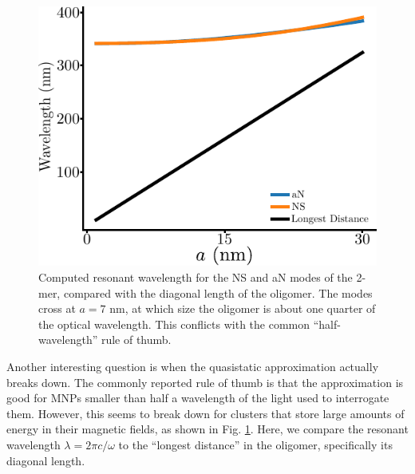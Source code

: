 \documentclass [11pt, proquest] {uwthesis}[2016/11/22]
\begin{document}
\begin{figure}
\begin{centering}
\includegraphics{length_comparison_scale.pdf}
\caption{Computed resonant wavelength for the NS and aN modes of the 2-mer, compared with the diagonal length of the oligomer. The modes cross at $a = 7$ nm, at which size the oligomer is about one quarter of the optical wavelength. This conflicts with the common ``half-wavelength'' rule of thumb.}
\label{scale_wavelength_comp}
\end{centering}
\end{figure}


Another interesting question is when the quasistatic approximation actually breaks down. The commonly reported rule of thumb is that the approximation is good for MNPs smaller than half a wavelength of the light used to interrogate them. However, this seems to break down for clusters that store large amounts of energy in their magnetic fields, as shown in Fig. \ref{scale_wavelength_comp}. Here, we compare the resonant wavelength $\lambda = 2\pi c/\omega$ to the ``longest distance'' in the oligomer, specifically its diagonal length.
\end{document}
